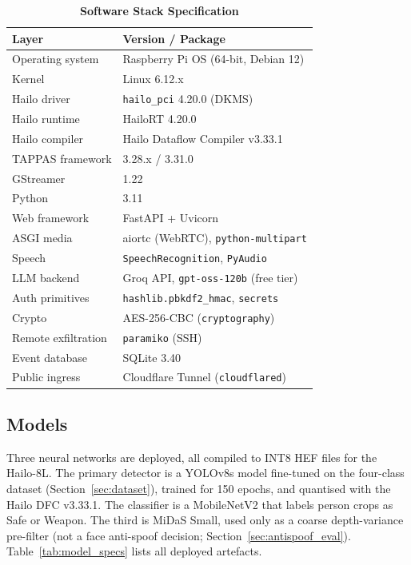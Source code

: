 \documentclass{ieeeaccess}
\begin{document}
\begin{table}[ht!]
\caption{\textbf{Software Stack Specification}}
\label{tab:sw_specs}
\setlength{\tabcolsep}{3pt}
\centering\footnotesize
\begin{tabular}{|l|p{4.3cm}|}
\hline
\textbf{Layer} & \textbf{Version / Package} \\
\hline
Operating system & Raspberry Pi OS (64-bit, Debian 12) \\
Kernel & Linux 6.12.x \\
Hailo driver & \texttt{hailo\_pci} 4.20.0 (DKMS) \\
Hailo runtime & HailoRT 4.20.0 \\
Hailo compiler & Hailo Dataflow Compiler v3.33.1 \\
TAPPAS framework & 3.28.x / 3.31.0 \\
GStreamer & 1.22 \\
Python & 3.11 \\
Web framework & FastAPI + Uvicorn \\
ASGI media & aiortc (WebRTC), \texttt{python-multipart} \\
Speech & \texttt{SpeechRecognition}, \texttt{PyAudio} \\
LLM backend & Groq API, \texttt{gpt-oss-120b} (free tier) \\
Auth primitives & \texttt{hashlib.pbkdf2\_hmac}, \texttt{secrets} \\
Crypto & AES-256-CBC (\texttt{cryptography}) \\
Remote exfiltration & \texttt{paramiko} (SSH) \\
Event database & SQLite 3.40 \\
Public ingress & Cloudflare Tunnel (\texttt{cloudflared}) \\
\hline
\end{tabular}
\end{table}

\subsection{Models}
Three neural networks are deployed, all compiled to INT8 HEF files for the Hailo-8L. The primary detector is a YOLOv8s model fine-tuned on the four-class dataset (Section~\ref{sec:dataset}), trained for 150 epochs, and quantised with the Hailo DFC v3.33.1. The classifier is a MobileNetV2 that labels person crops as Safe or Weapon. The third is MiDaS Small, used only as a coarse depth-variance pre-filter (not a face anti-spoof decision; Section~\ref{sec:antispoof_eval}). Table~\ref{tab:model_specs} lists all deployed artefacts.
\end{document}

